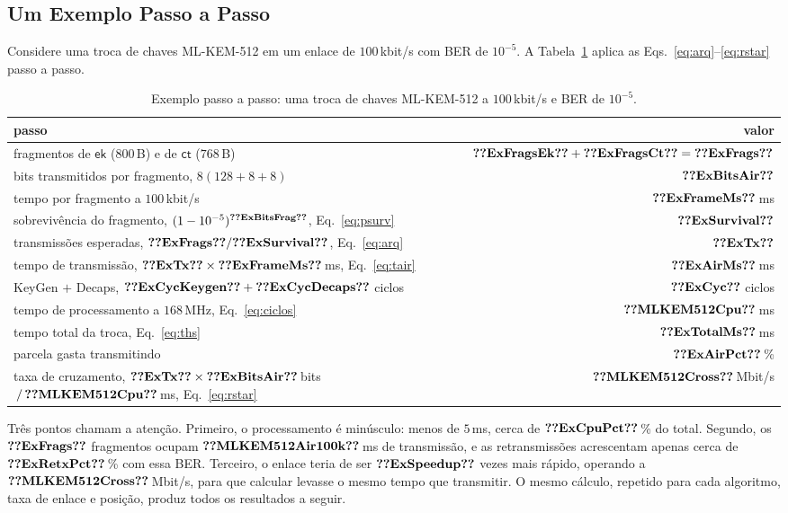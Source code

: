 \documentclass[12pt]{article}
\newcommand{\ek}{\mathsf{ek}}
\newcommand{\ct}{\mathsf{ct}}
\begin{document}
\subsection{Um Exemplo Passo a Passo}\label{sec:example}
Considere uma troca de chaves ML-KEM-512 em um enlace de $100$\,kbit/s com BER
de $10^{-5}$. A Tabela~\ref{tab:example} aplica as
Eqs.~\eqref{eq:arq}--\eqref{eq:rstar} passo a passo.

\begin{table}[!htb]
\caption{Exemplo passo a passo: uma troca de chaves ML-KEM-512 a $100$\,kbit/s
e BER de $10^{-5}$.}
\label{tab:example}
\centering
\small
\begin{tabular}{lr}
\toprule
passo & valor\\
\midrule
fragmentos de $\ek$ ($800$\,B) e de $\ct$ ($768$\,B) &
   $\val{ExFragsEk} + \val{ExFragsCt} = \val{ExFrags}$\\
bits transmitidos por fragmento, $8(128+8+8)$ & $\val{ExBitsAir}$\\
tempo por fragmento a $100$\,kbit/s & $\val{ExFrameMs}$\,ms\\
sobrevivência do fragmento, $(1-10^{-5})^{\val{ExBitsFrag}}$, Eq.~\eqref{eq:psurv} & $\val{ExSurvival}$\\
transmissões esperadas, $\val{ExFrags}/\val{ExSurvival}$, Eq.~\eqref{eq:arq} & $\val{ExTx}$\\
tempo de transmissão, $\val{ExTx}\times\val{ExFrameMs}$\,ms, Eq.~\eqref{eq:tair} & $\val{ExAirMs}$\,ms\\
\midrule
KeyGen $+$ Decaps, $\val{ExCycKeygen}+\val{ExCycDecaps}$ ciclos & $\val{ExCyc}$ ciclos\\
tempo de processamento a $168$\,MHz, Eq.~\eqref{eq:ciclos} & $\val{MLKEM512Cpu}$\,ms\\
\midrule
tempo total da troca, Eq.~\eqref{eq:ths} & $\val{ExTotalMs}$\,ms\\
parcela gasta transmitindo & $\val{ExAirPct}$\,\%\\
taxa de cruzamento, $\val{ExTx}\times\val{ExBitsAir}$\,bits$\,/\,\val{MLKEM512Cpu}$\,ms, Eq.~\eqref{eq:rstar} & $\val{MLKEM512Cross}$\,Mbit/s\\
\bottomrule
\end{tabular}
\end{table}

Três pontos chamam a atenção. Primeiro, o processamento é minúsculo: menos de
$5$\,ms, cerca de $\val{ExCpuPct}$\,\% do total. Segundo, os $\val{ExFrags}$
fragmentos ocupam $\val{MLKEM512Air100k}$\,ms de transmissão, e as
retransmissões acrescentam apenas cerca de $\val{ExRetxPct}$\,\% com essa BER.
Terceiro, o enlace teria de ser $\val{ExSpeedup}$ vezes mais rápido, operando a
$\val{MLKEM512Cross}$\,Mbit/s, para que calcular levasse o mesmo tempo que
transmitir. O mesmo cálculo, repetido para cada algoritmo, taxa de enlace e
posição, produz todos os resultados a seguir.
\end{document}
